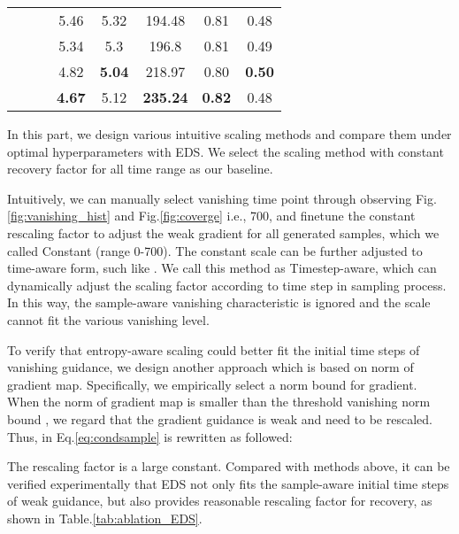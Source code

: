 \documentclass[runningheads]{llncs}
\newcommand{\cmark}{\ding{51}}\newcommand{\xmark}{\ding{55}}
\begin{document}
\begin{table}[!t]
\begin{center}
{\begin{tabular}{cccccccc}
        \cmark &  &     & 5.46 & 5.32  & 194.48  & 0.81      & 0.48 \\
         \cmark &  \cmark &   & 5.34 & 5.3 & 196.8  & 0.81      & 0.49 \\
          \cmark &  & \cmark   & 4.82 & \bf 5.04 & 218.97  & 0.80      & \bf 0.50 \\
         \cmark & \cmark & \cmark &\bf 4.67 & 5.12 & \bf 235.24  & \bf 0.82      & 0.48 \\
    \bottomrule
    \end{tabular}
    }
\end{center}
\vspace{-4mm}
\end{table} In this part, we design various intuitive scaling methods and compare them under optimal hyperparameters with EDS.
We select the scaling method with constant recovery factor for all time range \cite{dhariwal2021diffusion} as our baseline.

Intuitively, we can manually select vanishing time point through observing Fig.\ref{fig:vanishing_hist} and Fig.\ref{fig:coverge} i.e., 700, and finetune the constant rescaling factor to adjust the weak gradient for all generated samples, which we called Constant (range 0-700).
The constant scale can be further adjusted to time-aware form, such like .
We call this method as Timestep-aware, which can dynamically adjust the scaling factor according to time step in sampling process.
In this way, the sample-aware vanishing characteristic is ignored and the scale cannot fit the various vanishing level.


To verify that entropy-aware scaling could better fit the initial time steps of vanishing guidance, we design another approach which is based on norm of gradient map.
Specifically, we empirically select a norm bound  for gradient.
When the norm of gradient map is smaller than the threshold vanishing norm bound , we regard that the gradient guidance is weak and need to be rescaled.
Thus,  in Eq.\ref{eq:condsample} is rewritten as followed:

The rescaling factor  is a large constant.
Compared with methods above, it can be verified experimentally that EDS not only fits the sample-aware initial time steps of weak guidance, but also provides reasonable rescaling factor for recovery, as shown in Table.\ref{tab:ablation_EDS}.
\end{document}

